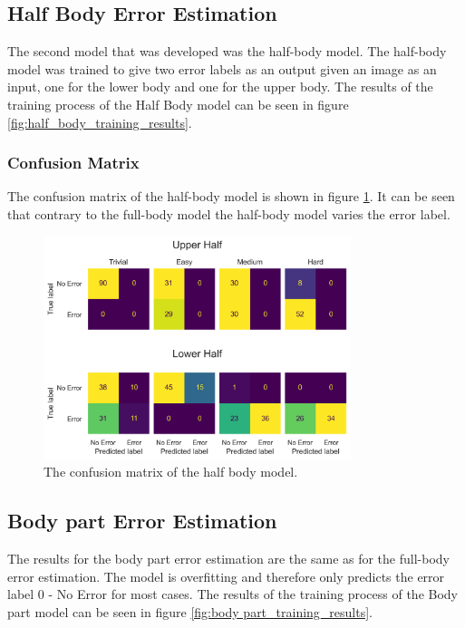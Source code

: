 \subsection{Half Body Error Estimation}
\label{sec:half_body}

The second model that was developed was the half-body model. The half-body model was trained to give two error labels as an output given an image as an input, one for the lower body and one for the upper body. The results of the training process of the Half Body model can be seen in figure \ref{fig:half_body_training_results}.

\subsubsection{Confusion Matrix}

The confusion matrix of the half-body model is shown in figure \ref{fig:half_body_confusion_matrix}. It can be seen that contrary to the full-body model the half-body model varies the error label. 

\begin{figure}[ht]
  \centering
  \includegraphics[width=0.8\textwidth]{figures/results/confusion/halves.png}
  \caption[Half Body model confusion matrix]{The confusion matrix of the half body model.}
  \label{fig:half_body_confusion_matrix}
\end{figure}

\subsection{Body part Error Estimation}
\label{sec:body part_error_estimation}

The results for the body part error estimation are the same as for the full-body error estimation. The model is overfitting and therefore only predicts the error label $0$ - No Error for most cases. The results of the training process of the Body part model can be seen in figure \ref{fig:body part_training_results}.

